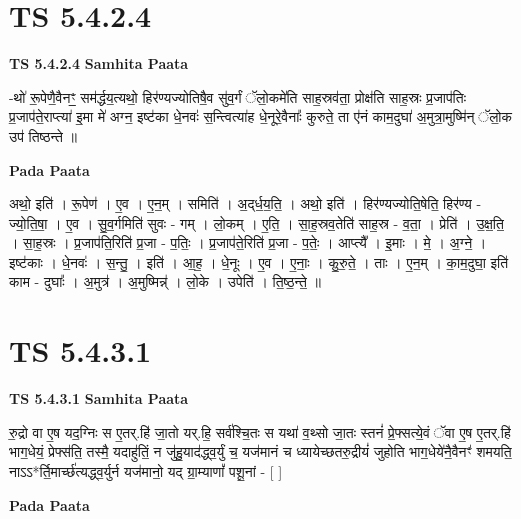 \documentclass[17pt]{extarticle}
\begin{document}

\section{ TS 5.4.2.4 }

\textbf{TS 5.4.2.4 } \newline
\textbf{Samhita Paata} \newline

-थो॑ रू॒पेणै॒वैनꣳ॒॒ सम॑र्द्धय॒त्यथो॒ हिर॑ण्यज्योतिषै॒व सु॑व॒र्गं ॅलो॒कमे॑ति साह॒स्रव॑ता॒ प्रोक्ष॑ति साह॒स्रः प्र॒जाप॑तिः प्र॒जाप॑ते॒राप्त्या॑ इ॒मा मे॑ अग्न॒ इष्ट॑का धे॒नवः॑ स॒न्त्वित्या॑ह धे॒नूरे॒वैनाः᳚ कुरुते॒ ता ए॑नं काम॒दुघा॑ अ॒मुत्रा॒मुष्मि॑न् ॅलो॒क उप॑ तिष्ठन्ते ॥ \newline

\textbf{Pada Paata} \newline

अथो॒ इति॑ । रू॒पेण॑ । ए॒व । ए॒न॒म् । समिति॑ । अ॒द्‌र्ध॒य॒ति॒ । अथो॒ इति॑ । हिर॑ण्यज्योति॒षेति॒ हिर॑ण्य - ज्यो॒ति॒षा॒ । ए॒व । सु॒व॒र्गमिति॑ सुवः - गम् । लो॒कम् । ए॒ति॒ । सा॒ह॒स्रव॒तेति॑ साह॒स्र - व॒ता॒ । प्रेति॑ । उ॒क्ष॒ति॒ । सा॒ह॒स्रः । प्र॒जाप॑ति॒रिति॑ प्र॒जा - प॒तिः॒ । प्र॒जाप॑ते॒रिति॑ प्र॒जा - प॒तेः॒ । आप्त्यै᳚ । इ॒माः । मे॒ । अ॒ग्ने॒ । इष्ट॑काः । धे॒नवः॑ । स॒न्तु॒ । इति॑ । आ॒ह॒ । धे॒नूः । ए॒व । ए॒नाः॒ । कु॒रु॒ते॒ । ताः । ए॒न॒म् । का॒म॒दुघा॒ इति॑ काम - दुघाः᳚ । अ॒मुत्र॑ । अ॒मुष्मिन्न्॑ । लो॒के । उपेति॑ । ति॒ष्ठ॒न्ते॒ ॥  \newline





\section{ TS 5.4.3.1 }

\textbf{TS 5.4.3.1 } \newline
\textbf{Samhita Paata} \newline

रु॒द्रो वा ए॒ष यद॒ग्निः स ए॒तर्.हि॑ जा॒तो यर्.हि॒ सर्व॑श्चि॒तः स यथा॑ व॒थ्सो जा॒तः स्तनं॑ प्रे॒फ्सत्ये॒वं ॅवा ए॒ष ए॒तर्.हि॑ भाग॒धेयं॒ प्रेफ्स॑ति॒ तस्मै॒ यदाहु॑तिं॒ न जु॑हु॒याद॑द्ध्व॒र्युं च॒ यज॑मानं च ध्यायेच्छतरु॒द्रीयं॑ जुहोति भाग॒धेये॑नै॒वैनꣳ॑ शमयति॒ नाऽऽ*र्ति॒मार्च्छ॑त्यद्ध्व॒र्युर्न यज॑मानो॒ यद् ग्रा॒म्याणां᳚ पशू॒नां - [  ] \newline

\textbf{Pada Paata} \newline
\end{document}
